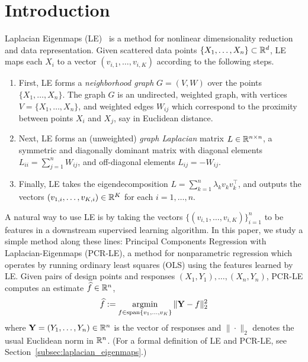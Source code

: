 \section{Introduction}
\label{sec:introduction}

Laplacian Eigenmaps (LE)~\citep{belkin03a} is a method for nonlinear dimensionality reduction and data representation. Given scattered data points $\{X_1,\ldots,X_n\} \subset \mathbb{R}^d$, LE maps each $X_i$ to a vector $(v_{i,1},\ldots,v_{i,K})$ according to the following steps.
\begin{enumerate}
	\item First, LE forms a \emph{neighborhood graph} $G = (V,W)$ over the points $\{X_1,\ldots,X_n\}$. The graph $G$ is an undirected, weighted graph, with vertices $V = \{X_1,\ldots,X_n\}$, and weighted edges $W_{ij}$ which correspond to the proximity between points $X_i$ and $X_j$, say in Euclidean distance.
	\item Next, LE forms an (unweighted) \emph{graph Laplacian} matrix $L \in \mathbb{R}^{n \times n}$, a symmetric and diagonally dominant matrix with diagonal elements $L_{ii} = \sum_{j = 1}^{n} W_{ij}$, and off-diagonal elements $L_{ij} = -W_{ij}$. 
	\item Finally, LE takes the eigendecomposition $L = \sum_{k = 1}^{n} \lambda_k v_k v_k^{\top}$, and outputs the vectors $(v_{1,i},\ldots,v_{K,i}) \in \mathbb{R}^K$ for each $i = 1,\ldots,n$.
\end{enumerate} 
A natural way to use LE is by taking the vectors $\{(v_{i,1},\ldots,v_{i,K})\}_{i = 1}^{n}$ to be features in a downstream supervised learning algorithm. In this paper, we study a simple method along these lines: Principal Components Regression with Laplacian-Eigenmaps (PCR-LE), a method for nonparametric regression which operates by running ordinary least squares (OLS) using the features learned by LE. Given pairs of design points and responses $(X_1,Y_1),\ldots, (X_n,Y_n)$, PCR-LE computes an estimate $\widehat{f} \in \mathbb{R}^n$,
\begin{equation}
\label{eqn:pcr-le}
\widehat{f} := \mathop{\mathrm{argmin}}_{f \in \mathrm{span}\{v_1,\ldots,v_K\}} \|{\bf Y} - f\|_2^2
\end{equation}
where ${\bf Y} = (Y_1,\ldots,Y_n) \in \mathbb{R}^n$ is the vector of responses and $\|\cdot\|_2$ denotes the usual Euclidean norm in $\mathbb{R}^n$. (For a formal definition of LE and PCR-LE, see Section~\ref{subsec:laplacian_eigenmaps}.)


